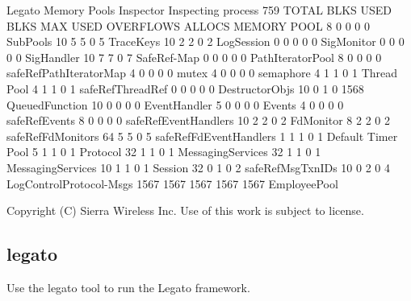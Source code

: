 \begin{DoxyVerb}Legato Memory Pools Inspector
Inspecting process 759
TOTAL BLKS  USED BLKS   MAX USED  OVERFLOWS     ALLOCS  MEMORY POOL
         8          0          0          0          0  SubPools
        10          5          5          0          5  TraceKeys
        10          2          2          0          2  LogSession
         0          0          0          0          0  SigMonitor
         0          0          0          0          0  SigHandler
        10          7          7          0          7  SafeRef-Map
         0          0          0          0          0  PathIteratorPool
         8          0          0          0          0  safeRefPathIteratorMap
         4          0          0          0          0  mutex
         4          0          0          0          0  semaphore
         4          1          1          0          1  Thread Pool
         4          1          1          0          1  safeRefThreadRef
         0          0          0          0          0  DestructorObjs
        10          0          1          0       1568  QueuedFunction
        10          0          0          0          0  EventHandler
         5          0          0          0          0  Events
         4          0          0          0          0  safeRefEvents
         8          0          0          0          0  safeRefEventHandlers
        10          2          2          0          2  FdMonitor
         8          2          2          0          2  safeRefFdMonitors
        64          5          5          0          5  safeRefFdEventHandlers
         1          1          1          0          1  Default Timer Pool
         5          1          1          0          1  Protocol
        32          1          1          0          1  MessagingServices
        32          1          1          0          1  MessagingServices
        10          1          1          0          1  Session
        32          0          1          0          2  safeRefMsgTxnIDs
        10          0          2          0          4  LogControlProtocol-Msgs
      1567       1567       1567       1567       1567  EmployeePool
\end{DoxyVerb}






Copyright (C) Sierra Wireless Inc. Use of this work is subject to license. \hypertarget{toolsTarget_legato}{}\subsection{legato}\label{toolsTarget_legato}
Use the {\ttfamily legato} tool to run the Legato framework.

